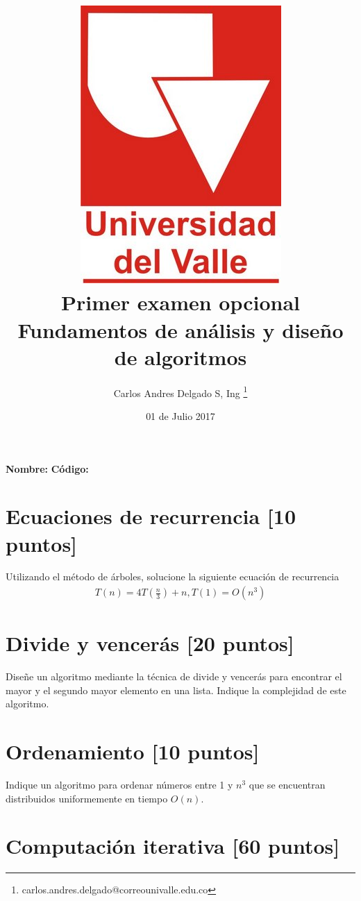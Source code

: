 \documentclass[10pt,twocolumn]{article}
\title{\vspace{-2.5cm} \includegraphics[scale=0.15]{univalle.jpg} \\Primer examen opcional \\ Fundamentos de análisis y diseño de algoritmos \\ \vspace{-0.5cm}}
\author{Carlos Andres Delgado S, Ing \footnote{ carlos.andres.delgado@correounivalle.edu.co }}
\date{\vspace{-0.2cm}01 de Julio 2017}
\newcommand{\raya}{\underline{\hspace{3cm}}}
\begin{document}
\maketitle
\vspace{-0.5cm}
{\bf Nombre:\underline{\hspace{6cm}}}
\hfill
{\bf Código:\raya}


\section{Ecuaciones de recurrencia \small{[10 puntos]}} 

 Utilizando el método de árboles, solucione la siguiente ecuación de recurrencia
	\begin{align*}
	      T(n) = 4T(\frac{n}{3}) + n, T(1) = O(n^3)
	\end{align*}	


\section{Divide y vencerás \small{[20 puntos]}} 

Diseñe un algoritmo mediante la técnica de divide y vencerás para encontrar el mayor y el segundo mayor elemento en una lista. Indique la complejidad de este algoritmo.

\section{Ordenamiento \small{[10 puntos]}} 

Indique un algoritmo para ordenar números  entre 1 y $n^3$ que se encuentran distribuidos uniformemente en tiempo $O(n)$.

\section{Computación iterativa \small{[60 puntos]}} 
\end{document}
